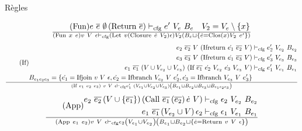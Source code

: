 \documentclass{beamer}
\begin{document}
\begin{frame}{Règles}
\begin{gather}
     \end{gather}
     \begin{gather}
        \tag{Fun}
        \begin{split}
           e ~ \overline{e} ~ \emptyset \left( \text{Return} ~ \overline{e} \right) \vdash_{\text{cfg}} e' ~ V_{e} ~ B_{e} \quad V_2 = V_{e} \setminus \lbrace x \rbrace
        \end{split}
        \over \left( \text{Fun} ~ x ~ e \right) v ~ V ~ \epsilon \vdash_{\text{cfg}} \left( \text{Let} ~ v \left( \text{Closure} ~ \dot{e} ~ V_2 \right) \epsilon \right) V_2 \left( B_{e} \sqcup \lbrace \dot{e} = \text{Clos} \left( x \right) V_2 ~ e' \rbrace \right)
     \end{gather}
     \begin{gather}
        \tag{If}
        \begin{split}
           e_2 ~ \overline{e_2} ~ V ~ (\text{Ifreturn} ~ \dot{e_1} ~ \overline{e_2} ~ V) &\vdash_{\text{cfg}} e_2' ~ V_{e_2} ~ B_{e_2} \\
           e_3 ~ \overline{e_3} ~ V ~ (\text{Ifreturn} ~ \dot{e_1} ~ \overline{e_3} ~ V) &\vdash_{\text{cfg}} e_3' ~ V_{e_3} ~ B_{e_3} \\
           e_1 ~ \overline{e_1} ~ (V \cup V_{e_2} \cup V_{e_3}) ~ (\text{If} ~ \overline{e_1} ~ \dot{e_2} ~ V_{e_2} ~ \dot{e_3} ~ V_{e_3} ~ V) &\vdash_{\text{cfg}} e_1' ~ V_{e_1} ~ B_{e_1} \\
           B_{e_1e_2e_3} = \lbrace \dot{e_1} = \text{Ifjoin} ~ v ~ V ~ \epsilon, \dot{e_2} = \text{Ifbranch} ~ V_{e_2} ~ V ~ e_2', \dot{e_3} = \text{Ifbranch} ~ V_{e_3} ~ V ~ e_3' \rbrace
        \end{split}
        \over (\text{If} ~ e_1 ~ e_2 ~ e_3) ~ v ~ V ~ \epsilon \vdash_{\text{cfg}} e_1' ~ (V_{e_1} \cup V_{e_2} \cup V_{e_3}) \left( B_{e_1} \sqcup B_{e_2} \sqcup B_{e_3} \sqcup B_{e_1e_2e_3} \right)
     \end{gather}
     \begin{gather}
        \tag{App}
        \begin{split}
           e_2 ~ \overline{e_2} \left( V \cup \lbrace \overline{e_1} \rbrace \right) \left( \text{Call} ~ \overline{e_1} \left( \overline{e_2} \right) \dot{e} ~ V \right) &\vdash_{\text{cfg}} \epsilon_2 ~ V_{e_2} ~ B_{e_2} \\
           e_1 ~ \overline{e_1} \left( V_{e_2} \cup V \right) \epsilon_2 &\vdash_{\text{cfg}} \epsilon_1 ~ V_{e_1} ~ B_{e_1}
        \end{split}
        \over \left( \text{App} ~ e_1 ~ e_2 \right) v ~ V ~ \epsilon \vdash_{\text{cfg}} \epsilon_2 \left( V_{e_1} \cup V_{e_2} \right) \left( B_{e_1} \sqcup B_{e_2} \sqcup \lbrace \dot{e} = \text{Return} ~ v ~ V ~ \epsilon \rbrace \right)

\end{gather}
\end{frame}
\end{document}
